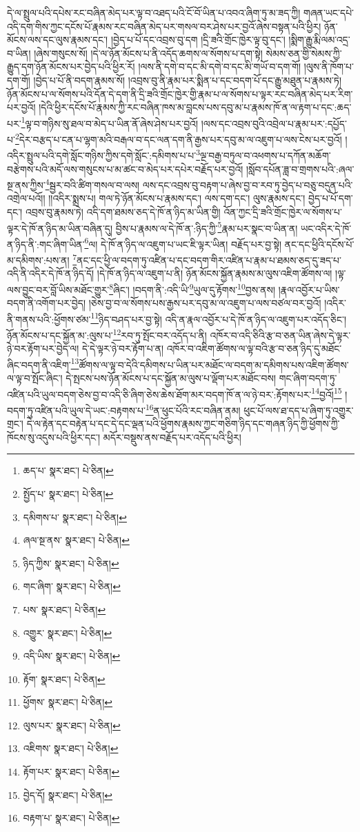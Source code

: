 དེ་ལ་སྤྲུལ་པའི་དཔེས་རང་བཞིན་མེད་པར་ལྟ་བ་འཐད་པའི་ངོ་བོ་ཡིན་པ་འབའ་ཞིག་ཏུ་མ་ཟད་ཀྱི། གཞན་ཡང་དཔེ་འདི་དག་གིས་ཀྱང་དངོས་པོ་རྣམས་རང་བཞིན་མེད་པར་གསལ་བར་ཤེས་པར་བྱའོ་ཞེས་བསྟན་པའི་ཕྱིར། ཉོན་མོངས་ལས་དང་ལུས་རྣམས་དང་། །བྱེད་པ་པོ་དང་འབྲས་བུ་དག །དྲི་ཟའི་གྲོང་ཁྱེར་ལྟ་བུ་དང་། །སྨིག་རྒྱུ་རྨི་ལམ་འདྲ་བ་ཡིན། །ཞེས་གསུངས་སོ། །དེ་ལ་ཉོན་མོངས་པ་ནི་འདོད་ཆགས་ལ་སོགས་པ་དག་སྟེ། སེམས་ཅན་གྱི་སེམས་ཀྱི་རྒྱུད་དག་ཉོན་མོངས་པར་བྱེད་པའི་ཕྱིར་རོ། །ལས་ནི་དགེ་བ་དང་མི་དགེ་བ་དང་མི་གཡོ་བ་དག་གོ། །ལུས་ནི་ཁོག་པ་དག་གོ། །བྱེད་པ་པོ་ནི་བདག་རྣམས་སོ། །འབྲས་བུ་ནི་རྣམ་པར་སྨིན་པ་དང་བདག་པོ་དང་རྒྱུ་མཐུན་པ་རྣམས་ཏེ། ཉོན་མོངས་པ་ལ་སོགས་པའི་དོན་དེ་དག་ནི་དྲི་ཟའི་གྲོང་ཁྱེར་གྱི་རྣམ་པ་ལ་སོགས་པ་ལྟར་རང་བཞིན་མེད་པར་རིག་པར་བྱའོ། །དེའི་ཕྱིར་དངོས་པོ་རྣམས་ཀྱི་རང་བཞིན་ཁས་མ་བླངས་པས་དབུ་མ་པ་རྣམས་ཁོ་ན་ལ་རྟག་པ་དང་:ཆད་པར་\footnote{ཆད་པ་  སྣར་ཐང་།  པེ་ཅིན། }ལྟ་བ་གཉིས་སུ་ཐལ་བ་མེད་པ་ཡིན་ནོ་ཞེས་ཤེས་པར་བྱའོ། །ལས་དང་འབྲས་བུའི་འབྲེལ་པ་རྣམ་པར་:དཔྱོད་པ་\footnote{སྤྱོད་པ་  སྣར་ཐང་།  པེ་ཅིན། }དེར་བརྩད་པ་ངན་པ་ལྷག་མའི་བརྒལ་བ་དང་ལན་དག་ནི་རྒྱས་པར་དབུ་མ་ལ་འཇུག་པ་ལས་ངེས་པར་བྱའོ། །འདིར་སྤྲུལ་པའི་དགེ་སློང་གཉིས་ཀྱིས་དགེ་སློང་:དམིགས་པ་པ་\footnote{དམིགས་པ་  སྣར་ཐང་།  པེ་ཅིན། }ལྔ་བརྒྱ་བཏུལ་བ་འཕགས་པ་དཀོན་མཆོག་བརྩེགས་པའི་མདོ་ལས་གསུངས་པ་མ་ཚང་བ་མེད་པར་དཔེར་བརྗོད་པར་བྱའོ། །སློབ་དཔོན་ཟླ་བ་གྲགས་པའི་:ཞལ་སྔ་ནས་ཀྱིས་\footnote{ཞལ་སྔ་ནས་  སྣར་ཐང་།  པེ་ཅིན། }སྦྱར་བའི་ཚིག་གསལ་བ་ལས། ལས་དང་འབྲས་བུ་བརྟག་པ་ཞེས་བྱ་བ་རབ་ཏུ་བྱེད་པ་བཅུ་བདུན་པའི་འགྲེལ་པའོ།། །།འདིར་སྨྲས་པ། གལ་ཏེ་ཉོན་མོངས་པ་རྣམས་དང་། ལས་དག་དང་། ལུས་རྣམས་དང་། བྱེད་པ་པོ་དག་དང་། འབྲས་བུ་རྣམས་ཏེ། འདི་དག་ཐམས་ཅད་དེ་ཁོ་ན་ཉིད་མ་ཡིན་གྱི། འོན་ཀྱང་དྲི་ཟའི་གྲོང་ཁྱེར་ལ་སོགས་པ་ལྟར་དེ་ཁོ་ན་ཉིད་མ་ཡིན་བཞིན་དུ། བྱིས་པ་རྣམས་ལ་དེ་ཁོ་ན་:ཉིད་ཀྱི་\footnote{ཉིད་ཀྱིས་  སྣར་ཐང་།  པེ་ཅིན། }རྣམ་པར་སྣང་བ་ཡིན་ན། ཡང་འདིར་དེ་ཁོ་ན་ཉིད་ནི་:གང་ཞིག་ཡིན་\footnote{གང་ཞིག་  སྣར་ཐང་།  པེ་ཅིན། }ལ། དེ་ཁོ་ན་ཉིད་ལ་འཇུག་པ་ཡང་ཇི་ལྟར་ཡིན། བརྗོད་པར་བྱ་སྟེ། ནང་དང་ཕྱིའི་དངོས་པོ་མ་དམིགས་:པས་ན། \footnote{པས་  སྣར་ཐང་།  པེ་ཅིན། }ནང་དང་ཕྱི་ལ་བདག་ཏུ་འཛིན་པ་དང་བདག་གིར་འཛིན་པ་རྣམ་པ་ཐམས་ཅད་དུ་ཟད་པ་འདི་ནི་འདིར་དེ་ཁོ་ན་ཉིད་དོ། །དེ་ཁོ་ན་ཉིད་ལ་འཇུག་པ་ནི། ཉོན་མོངས་སྐྱོན་རྣམས་མ་ལུས་འཇིག་ཚོགས་ལ། །ལྟ་ལས་བྱུང་བར་བློ་ཡིས་མཐོང་གྱུར་\footnote{འགྱུར་  སྣར་ཐང་།  པེ་ཅིན། }ཞིང་། །བདག་ནི་:འདི་ཡི་\footnote{འདི་ཡིས་  སྣར་ཐང་།  པེ་ཅིན། }ཡུལ་དུ་རྟོགས་\footnote{རྟོག་  སྣར་ཐང་།  པེ་ཅིན། }བྱས་ནས། །རྣལ་འབྱོར་པ་ཡིས་བདག་ནི་འགོག་པར་བྱེད། །ཅེས་བྱ་བ་ལ་སོགས་པས་རྒྱས་པར་དབུ་མ་ལ་འཇུག་པ་ལས་བཙལ་བར་བྱའོ། །འདིར་ནི་གནས་པའི་:ཕྱོགས་ཙམ་\footnote{ཕྱོགས་  སྣར་ཐང་།  པེ་ཅིན། }ཉིད་བཤད་པར་བྱ་སྟེ། འདི་ན་རྣལ་འབྱོར་པ་དེ་ཁོ་ན་ཉིད་ལ་འཇུག་པར་འདོད་ཅིང་། ཉོན་མོངས་པ་དང་སྐྱོན་མ་:ལུས་པ་\footnote{ལུས་པར་  སྣར་ཐང་།  པེ་ཅིན། }རབ་ཏུ་སྤོང་བར་འདོད་པ་ནི། འཁོར་བ་འདི་ཅིའི་རྩ་བ་ཅན་ཡིན་ཞེས་དེ་ལྟར་ཉེ་བར་རྟོག་པར་བྱེད་ལ། དེ་དེ་ལྟར་ཉེ་བར་རྟོག་པ་ན། འཁོར་བ་འཇིག་ཚོགས་ལ་ལྟ་བའི་རྩ་བ་ཅན་ཉིད་དུ་མཐོང་ཞིང་བདག་ནི་འཇིག་\footnote{འཇིགས་  སྣར་ཐང་།  པེ་ཅིན། }ཚོགས་ལ་ལྟ་བ་དེའི་དམིགས་པ་ཡིན་པར་མཐོང་ལ་བདག་མ་དམིགས་པས་འཇིག་ཚོགས་ལ་ལྟ་བ་སྤོང་ཞིང་། དེ་སྤངས་པས་ཉོན་མོངས་པ་དང་སྐྱོན་མ་ལུས་པ་ལྡོག་པར་མཐོང་བས། གང་ཞིག་བདག་ཏུ་འཛིན་པའི་ཡུལ་བདག་ཅེས་བྱ་བ་འདི་ཅི་ཞིག་ཅེས་ཆེས་ཐོག་མར་བདག་ཁོ་ན་ལ་ཉེ་བར་:རྟོགས་པར་\footnote{རྟོག་པར་  སྣར་ཐང་།  པེ་ཅིན། }བྱའོ།\footnote{བྱེད་དོ།  སྣར་ཐང་།  པེ་ཅིན། } །བདག་ཏུ་འཛིན་པའི་ཡུལ་དེ་ཡང་:བརྟགས་པ་\footnote{བརྟག་པ་  སྣར་ཐང་།  པེ་ཅིན། }ན་ཕུང་པོའི་རང་བཞིན་ནམ། ཕུང་པོ་ལས་ཐ་དད་པ་ཞིག་ཏུ་འགྱུར་གྲང་། དེ་ལ་རྟེན་དང་བརྟེན་པ་དང་དེ་དང་ལྡན་པའི་ཕྱོགས་རྣམས་ཀྱང་གཅིག་ཉིད་དང་གཞན་ཉིད་ཀྱི་ཕྱོགས་ཀྱི་ཁོངས་སུ་འདུས་པའི་ཕྱིར་དང་། མདོར་བསྡུས་ནས་བརྗོད་པར་འདོད་པའི་ཕྱིར། 